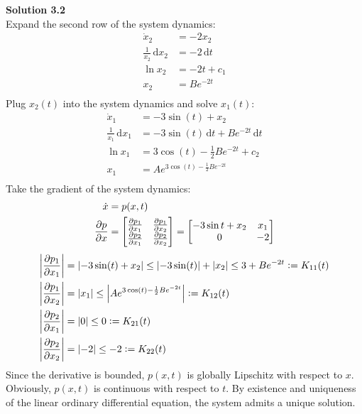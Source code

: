 \documentclass[a4paper,10.5pt]{article}
\newcommand{\defeq}{\vcentcolon=}
\newcommand{\dt}{\, \mathrm{d} t}
\newcommand{\dx}{\, \mathrm{d} x}
\newcommand{\abs}[1]{\left|#1\right|}
\newenvironment{mymat}{\left[\begin{matrix}}{\end{matrix}\right]}
\begin{document}
\noindent \textbf {Solution 3.2} \\
Expand the second row of the system dynamics:
\begin{align*}
	\dot{x}_2 &= -2x_2 \\
	\frac{1}{x_2} \dx _2 &= -2 \dt \\
	\ln x_2 &= -2t + c_1 \\
	x_2 &= Be^{-2t} \\
\end{align*}
Plug $x_2(t)$ into the system dynamics and solve $x_1(t)$:
\begin{align*}
	\dot{x}_1 &= -3 \sin (t) + x_2 \\
	\frac{1}{x_1}\dx _1 &= -3\sin (t) \dt + Be^{-2t}\dt \\
	\ln x_1 &= 3 \cos(t) - \frac{1}{2} Be^{-2t} + c_2\\
	x_1 &= Ae^{3 \cos(t)- \frac{1}{2} Be^{-2t}}\\
\end{align*}
Take the gradient of the system dynamics:
\begin{align*}
\dot{x} &= p(x,t) \\
\frac{\partial p}{\partial x} &=  \begin{mymat}\frac{\partial p_1}{\partial x_1} & \frac{\partial p_1}{\partial x_2} \\
\frac{\partial p_2}{\partial x_1} & \frac{\partial p_2}{\partial x_2}
\end{mymat} = \begin{mymat}
-3\sin t + x_2 & x_1 \\
0 & -2
\end{mymat}
\end{align*}
\begin{align*}
\abs{\frac{\partial p_1}{\partial x_1}} &= \abs{-3\sin(t)+x_2} \leq \abs{-3\sin(t)} + \abs{x_2} \leq 3 + Be^{-2t} \defeq K_{11}(t)\\
\abs{\frac{\partial p_1}{\partial x_2}} &= \abs{x_1} \leq \abs{Ae^{3 \cos(t)- \frac{1}{2} Be^{-2t}}} \defeq K_{12}(t) \\
\abs{\frac{\partial p_2}{\partial x_1}} &= \abs{0} \leq 0 \defeq K_{21}(t) \\
\abs{\frac{\partial p_2}{\partial x_2}} &= \abs{-2} \leq -2 \defeq K_{22}(t)
\end{align*}
Since the derivative is bounded, $p(x,t)$ is globally Lipschitz with respect to $x$. Obviously, $p(x,t)$ is continuous with respect to $t$. By existence and uniqueness of the linear ordinary differential equation, the system admits a unique solution. \\
\end{document}
